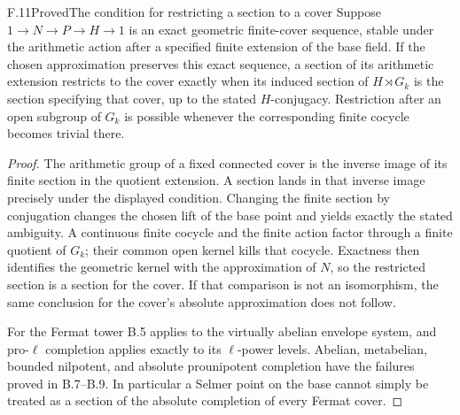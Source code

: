 \begin{statement}{F.11}{Proved}{The condition for restricting a section to a cover}
Suppose $1\to N\to P\to H\to1$ is an exact geometric
finite-cover sequence, stable under the arithmetic
action after a specified finite extension of the base
field. If the chosen approximation preserves this
exact sequence, a section of its arithmetic extension
restricts to the cover exactly when its induced section
of $H\rtimes G_k$ is the section specifying that cover,
up to the stated $H$-conjugacy. Restriction after an
open subgroup of $G_k$ is possible whenever the
corresponding finite cocycle becomes trivial there.
\end{statement}
\begin{proof}
The arithmetic group of a fixed connected cover is
the inverse image of its finite section in the
quotient extension. A section lands in that inverse
image precisely under the displayed condition.
Changing the finite section by conjugation changes
the chosen lift of the base point and yields exactly
the stated ambiguity. A continuous finite cocycle
and the finite action factor through a finite
quotient of $G_k$; their common open kernel kills
that cocycle. Exactness then identifies the geometric
kernel with the approximation of $N$, so the
restricted section is a section for the cover.
If that comparison is not an isomorphism, the
same conclusion for the cover's absolute approximation
does not follow.

For the Fermat tower B.5 applies to the virtually
abelian envelope system, and pro-$\ell$ completion
applies exactly to its $\ell$-power levels. Abelian,
metabelian, bounded nilpotent, and absolute
prounipotent completion have the failures proved
in B.7--B.9. In particular a Selmer point on the
base cannot simply be treated as a section of the
absolute completion of every Fermat cover.
\end{proof}

